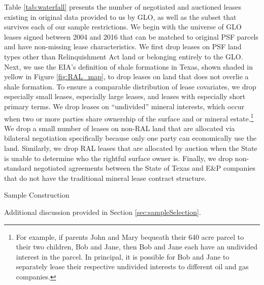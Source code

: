 \begin{appendices}
Table \ref{tab:waterfall} presents the number of negotiated and auctioned leases existing in original data provided to us by GLO, as well as the subset that survives each of our sample restrictions. We begin with the universe of GLO leases signed between 2004 and 2016 that can be matched to original PSF parcels and have non-missing lease characteristics.  We first drop leases on PSF land types other than Relinquishment Act land or belonging entirely to the GLO.  Next, we use the EIA's definition of shale formations in Texas, shown shaded in yellow in Figure \ref{fig:RAL_map}, to drop leases on land that does not overlie a shale formation.  To ensure a comparable distribution of lease covariates, we drop especially small leases, especially large leases, and leases with especially short primary terms.  We drop leases on ``undivided'' mineral interests, which occur when two or more parties share ownership of the surface and or mineral estate.\footnote{For example, if parents John and Mary bequeath their 640 acre parcel to their two children, Bob and Jane, then Bob and Jane each have an undivided interest in the parcel.  In principal, it is possible for Bob and Jane to separately lease their respective undivided interests to different oil and gas companies.} We drop a small number of leases on non-RAL land that are allocated via bilateral negotiation specifically because only one party can economically use the land.   Similarly, we drop RAL leases that are allocated by auction when the State is unable to determine who the rightful surface owner is.  Finally, we drop non-standard negotiated agreements between the State of Texas and E\&P companies that do not have the traditional mineral lease contract structure.

\begin{table}[H]
	\begin{center}
	\begin{threeparttable}
		\caption{Sample Construction}
		\label{tab:waterfall}
		\small
		            
		\footnotesize
		\begin{tablenotes}
			\item Additional discussion provided in Section \ref{sec:sampleSelection}.
		\end{tablenotes}
	\end{threeparttable}
	\end{center}
\end{table}


\end{appendices}
